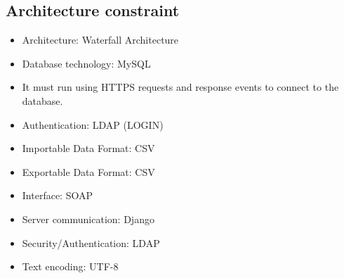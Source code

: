 \documentclass[10pt,a4paper]{article}
\begin{document}
\subsection{Architecture constraint}
       \begin{itemize}
                \item Architecture: Waterfall Architecture 
        \end{itemize}
       \begin{itemize}
                \item Database technology: MySQL
        \end{itemize}
                \begin{itemize}
                        \item  It must run using HTTPS requests and response events to connect to the database.
                \end{itemize}
                \begin{itemize}
                        \item Authentication: LDAP (LOGIN)                 
                                \end{itemize} 
                \begin{itemize}
                        \item Importable Data Format: CSV
                \end{itemize}
                \begin{itemize}
                        \item Exportable Data Format: CSV
                \end{itemize}
                \begin{itemize}
                        \item Interface: SOAP
                \end{itemize}
                \begin{itemize}
                        \item Server communication: Django
                \end{itemize}
                \begin{itemize}
                        \item Security/Authentication: LDAP
                \end{itemize}
                \begin{itemize}
                        \item Text encoding: UTF-8
                \end{itemize}
\end{document}
